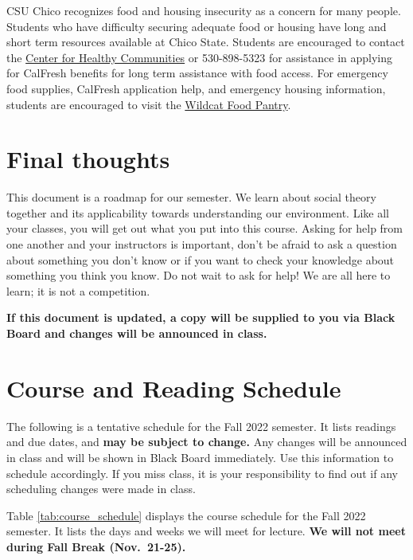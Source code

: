 \documentclass[11pt,]{article}
\begin{document}
CSU Chico recognizes food and housing insecurity as a concern for many
people. Students who have difficulty securing adequate food or housing
have long and short term resources available at Chico State. Students
are encouraged to contact the
\href{https://www.csuchico.edu/chc/}{Center for Healthy Communities} or
530-898-5323 for assistance in applying for CalFresh benefits for long
term assistance with food access. For emergency food supplies, CalFresh
application help, and emergency housing information, students are
encouraged to visit the
\href{https://www.csuchico.edu/basic-needs/pantry.shtml}{Wildcat Food
Pantry}.

\hypertarget{final-thoughts}{%
\section{Final thoughts}\label{final-thoughts}}

This document is a roadmap for our semester. We learn about social
theory together and its applicability towards understanding our
environment. Like all your classes, you will get out what you put into
this course. Asking for help from one another and your instructors is
important, don't be afraid to ask a question about something you don't
know or if you want to check your knowledge about something you think
you know. Do not wait to ask for help! We are all here to learn; it is
not a competition.

\textbf{If this document is updated, a copy will be supplied to you via
Black Board and changes will be announced in class.}

\newpage

\renewcommand{\arraystretch}{1.25}

\hypertarget{course-and-reading-schedule}{%
\section{Course and Reading
Schedule}\label{course-and-reading-schedule}}

The following is a tentative schedule for the Fall 2022 semester. It
lists readings and due dates, and \textbf{may be subject to change.} Any
changes will be announced in class and will be shown in Black Board
immediately. Use this information to schedule accordingly. If you miss
class, it is your responsibility to find out if any scheduling changes
were made in class.

Table \ref{tab:course_schedule} displays the course schedule for the
Fall 2022 semester. It lists the days and weeks we will meet for
lecture. \textbf{We will not meet during Fall Break (Nov.~21-25).}
\end{document}

